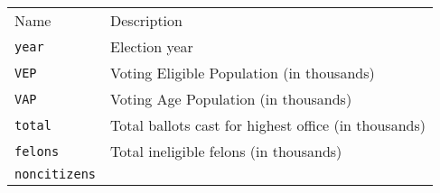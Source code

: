 \documentclass[]{article}
\begin{document}
\begin{longtable}[c]{@{}ll@{}}
\toprule\addlinespace
\begin{minipage}[b]{0.25\columnwidth}\raggedright
Name
\end{minipage} & \begin{minipage}[b]{0.68\columnwidth}\raggedright
Description
\end{minipage}
\\\addlinespace
\midrule\endhead
\begin{minipage}[t]{0.25\columnwidth}\raggedright
\texttt{year}
\end{minipage} & \begin{minipage}[t]{0.68\columnwidth}\raggedright
Election year
\end{minipage}
\\\addlinespace
\begin{minipage}[t]{0.25\columnwidth}\raggedright
\texttt{VEP}
\end{minipage} & \begin{minipage}[t]{0.68\columnwidth}\raggedright
Voting Eligible Population (in thousands)
\end{minipage}
\\\addlinespace
\begin{minipage}[t]{0.25\columnwidth}\raggedright
\texttt{VAP}
\end{minipage} & \begin{minipage}[t]{0.68\columnwidth}\raggedright
Voting Age Population (in thousands)
\end{minipage}
\\\addlinespace
\begin{minipage}[t]{0.25\columnwidth}\raggedright
\texttt{total}
\end{minipage} & \begin{minipage}[t]{0.68\columnwidth}\raggedright
Total ballots cast for highest office (in thousands)
\end{minipage}
\\\addlinespace
\begin{minipage}[t]{0.25\columnwidth}\raggedright
\texttt{felons}
\end{minipage} & \begin{minipage}[t]{0.68\columnwidth}\raggedright
Total ineligible felons (in thousands)
\end{minipage}
\\\addlinespace
\begin{minipage}[t]{0.25\columnwidth}\raggedright
\texttt{noncitizens}
\end{minipage} & \begin{minipage}[t]{0.68\columnwidth}\raggedright

\end{minipage}
\end{longtable}
\end{document}
